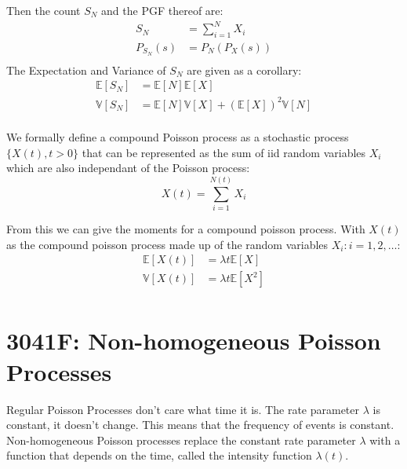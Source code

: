 Then the count \(S_N\) and the PGF thereof are:
\begin{equation*}
    \begin{aligned}
        S_N &= \sum_{i=1}^{N} X_i \\
        P_{S_N}(s) &= P_N(P_X(s)) \\
    \end{aligned}
\end{equation*}
The Expectation and Variance of \(S_N\) are given as a corollary:
\begin{equation*}
    \begin{aligned}
        \mathbb{E}[S_N] &= \mathbb{E}[N] \mathbb{E}[X]\\
        \mathbb{V}[S_N] &= \mathbb{E}[N]\mathbb{V}[X] + \left( \mathbb{E}[X]\right)^2 \mathbb{V}[N]\\
    \end{aligned}
\end{equation*}


We formally define a compound Poisson process as a stochastic 
process \(\{X(t), t > 0\}\) that can be represented as the sum of iid random variables \(X_i\) which are also independant of the Poisson process:
\begin{equation*}
    X(t) = \sum_{i = 1}^{N(t)} X_i
\end{equation*}

From this we can give the moments for a compound poisson process. With \(X(t)\) as the 
compound poisson process made up of the random variables \(X_i: i=1, 2, \dots\):
\begin{equation*}
    \begin{aligned}
        \mathbb{E}[X(t)] &= \lambda t \mathbb{E}[X]   \\
        \mathbb{V}[X(t)] &= \lambda t \mathbb{E}[X^2] \\
    \end{aligned}
\end{equation*}
\section{3041F: Non-homogeneous Poisson Processes}
Regular Poisson Processes don't care what time it is. 
The rate parameter \(\lambda\) is constant, it doesn't change. This means that the frequency of events is constant.
Non-homogeneous Poisson processes replace the constant rate parameter \(\lambda\) with a function that depends on the time, called the intensity function \(\lambda(t)\).

